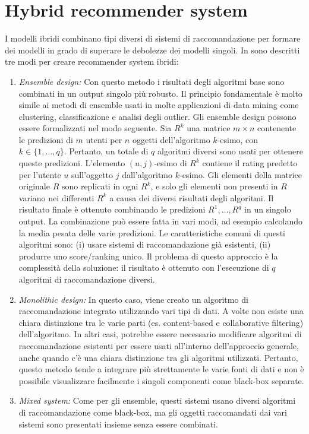 \section{Hybrid recommender system}
I modelli ibridi combinano tipi diversi di sistemi di raccomandazione per formare dei modelli in grado di superare le debolezze dei modelli singoli. In \cite{recsys-book} sono descritti tre modi per creare recommender system ibridi:

\begin{enumerate}
 \item \textit{Ensemble design:} Con questo metodo i risultati degli algoritmi base sono combinati in un output singolo più robusto. Il principio fondamentale è molto simile ai metodi di ensemble usati in molte applicazioni di data mining come clustering, classificazione e analisi degli outlier. 
Gli ensemble design possono essere formalizzati nel modo seguente. Sia $R^k$ una matrice $m \times n$ contenente le predizioni di $m$ utenti per $n$ oggetti dell'algoritmo $k$-esimo, con $k \in \{1, \dots ,q\}$. Pertanto, un totale di $q$ algoritmi diversi sono usati per ottenere queste predizioni. L'elemento $(u,j)$-esimo di $R^k$ contiene il rating predetto per l'utente $u$ sull'oggetto $j$ dall'algoritmo $k$-esimo. Gli elementi della matrice originale $R$ sono replicati in ogni $R^k$, e solo gli elementi non presenti in $R$ variano nei differenti $R^k$ a causa dei diversi risultati degli algoritmi. Il risultato finale è ottenuto combinando le predizioni $R^1, \dots, R^q$ in un singolo output. La combinazione può essere fatta in vari modi, ad esempio calcolando la media pesata delle varie predizioni. Le caratteristiche comuni di questi algoritmi sono: (i) usare sistemi di raccomandazione già esistenti, (ii) produrre uno score/ranking unico. Il problema di questo approccio è la complessità della soluzione: il risultato è ottenuto con l'esecuzione di $q$ algoritmi di raccomandazione diversi.

 \item \textit{Monolithic design:} In questo caso, viene creato un algoritmo di raccomandazione integrato utilizzando vari tipi di dati. A volte non esiste una chiara distinzione tra le varie parti (es. content-based e collaborative filtering) dell'algoritmo. In altri casi, potrebbe essere necessario modificare algoritmi di raccomandazione esistenti per essere usati all'interno dell'approccio generale, anche quando c'è una chiara distinzione tra gli algoritmi utilizzati.  Pertanto, questo metodo tende a integrare più strettamente le varie fonti di dati e non è possibile visualizzare facilmente i singoli componenti come black-box separate.
 
 \item \textit{Mixed system:}  Come per gli ensemble, questi sistemi usano diversi algoritmi di raccomandazione come black-box, ma gli oggetti raccomandati dai vari sistemi sono presentati insieme senza essere combinati.
\end{enumerate} 

